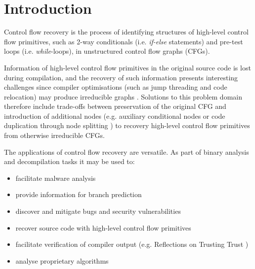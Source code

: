 
\section{Introduction}

Control flow recovery is the process of identifying structures of high-level control flow primitives, such as 2-way conditionals (i.e. \textit{if-else} statements) and pre-test loops (i.e. \textit{while}-loops), in unstructured control flow graphs (CFGs).

Information of high-level control flow primitives in the original source code is lost during compilation, and the recovery of such information presents interesting challenges since compiler optimisations (such as jump threading and code relocation) may produce irreducible graphs \cite{cifuentes_reverse_comp}. Solutions to this problem domain therefore include trade-offs between preservation of the original CFG and introduction of additional nodes (e.g. auxiliary conditional nodes \cite{no_more_gotos} or code duplication through node splitting \cite{node_splitting}) to recovery high-level control flow primitives from otherwise irreducible CFGs.

The applications of control flow recovery are versatile. As part of binary analysis and decompilation tasks it may be used to:

\begin{itemize}
	\item facilitate malware analysis
	\item provide information for branch prediction
	\item discover and mitigate bugs and security vulnerabilities
	\item recover source code with high-level control flow primitives
	\item facilitate verification of compiler output (e.g. Reflections on Trusting Trust \cite{trusting_trust})
	\item analyse proprietary algorithms
\end{itemize}




